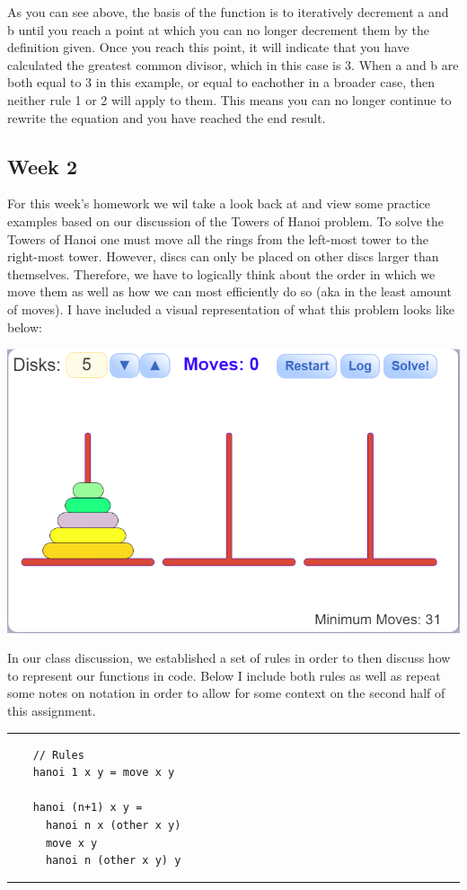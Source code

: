 \documentclass{article}
\theoremstyle{theorem}
\theoremstyle{definition}
\theoremstyle{remark}
\begin{document}
As you can see above, the basis of the function is to iteratively decrement a and b until you reach a point at which you can no longer
decrement them by the definition given. Once you reach this point, it will indicate that you have calculated the greatest common divisor, which 
in this case is 3. When a and b are both equal to 3 in this example, or equal to eachother in a broader case, then neither rule 1 or 2 will apply to them. This means you can no longer 
continue to rewrite the equation and you have reached the end result. 

\subsection{Week 2}
For this week's homework we wil take a look back at and view some practice examples based on our discussion of the Towers of Hanoi problem. To solve the Towers of Hanoi one must move all the rings
from the left-most tower to the right-most tower. However, discs can only be placed on other discs larger than themselves. Therefore, we have to logically think about the 
order in which we move them as well as how we can most efficiently do so (aka in the least amount of moves). I have included a visual representation of what this problem looks like below: 
\begin{center}
  \includegraphics[scale=0.7]{towersOfHanoi_visual.png}
\end{center}

In our class discussion, we established a set of rules in order to then discuss how to represent our functions in code. Below I include both rules as well as repeat some notes on notation 
in order to allow for some context on the second half of this assignment.\\
\noindent
  {\color{gray} \rule{\linewidth}{0.05mm}}
\begin{center}
  \begin{verbatim}
    // Rules
    hanoi 1 x y = move x y 

    hanoi (n+1) x y = 
      hanoi n x (other x y)
      move x y 
      hanoi n (other x y) y
  \end{verbatim}
\end{center}
\noindent
  {\color{gray} \rule{\linewidth}{0.05mm}}
\end{document}
